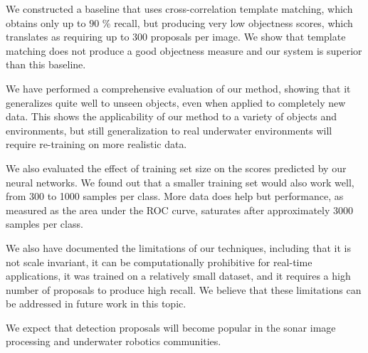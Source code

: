 We constructed a baseline that uses cross-correlation template matching, which obtains only up to $90$ \% recall, but producing very low objectness scores, which translates as requiring up to 300 proposals per image. We show that template matching does not produce a good objectness measure and our system is superior than this baseline.

We have performed a comprehensive evaluation of our method, showing that it generalizes quite well to unseen objects, even when applied to completely new data. This shows the applicability of our method to a variety of objects and environments, but still generalization to real underwater environments will require re-training on more realistic data.

We also evaluated the effect of training set size on the scores predicted by our neural networks. We found out that a smaller training set would also work well, from 300 to 1000 samples per class. More data does help but performance, as measured as the area under the ROC curve, saturates after approximately 3000 samples per class.

We also have documented the limitations of our techniques, including that it is not scale invariant, it can be computationally prohibitive for real-time applications, it was trained on a relatively small dataset, and it requires a high number of proposals to produce high recall. We believe that these limitations can be addressed in future work in this topic.

We expect that detection proposals will become popular in the sonar image processing and underwater robotics communities.